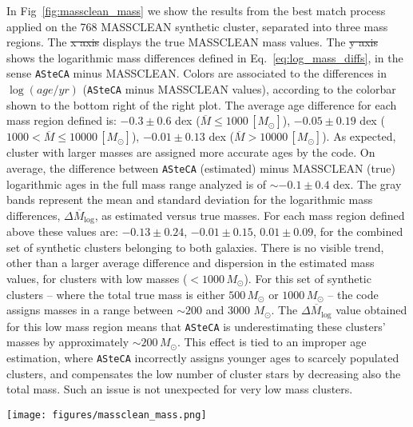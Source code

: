 \documentclass[draft]{aa}
\providecommand{\DIFaddtex}[1]{{\protect\color{blue}\uwave{#1}}} %
\providecommand{\DIFdeltex}[1]{{\protect\color{red}\sout{#1}}}                      %
\providecommand{\DIFaddbegin}{} %
\providecommand{\DIFaddend}{} %
\providecommand{\DIFdelbegin}{} %
\providecommand{\DIFdelend}{} %
\providecommand{\DIFaddFL}[1]{\DIFadd{#1}} %
\providecommand{\DIFdelFL}[1]{\DIFdel{#1}} %
\providecommand{\DIFaddbeginFL}{} %
\providecommand{\DIFaddendFL}{} %
\providecommand{\DIFdelbeginFL}{} %
\providecommand{\DIFdelendFL}{} %
\providecommand{\DIFadd}[1]{\texorpdfstring{\DIFaddtex{#1}}{#1}} %
\providecommand{\DIFdel}[1]{\texorpdfstring{\DIFdeltex{#1}}{}} %
\begin{document}
\begin{appendix}
In Fig~\ref{fig:massclean_mass} we show the results from the best match process
applied on the 768 MASSCLEAN synthetic cluster, separated into three mass
regions. The \DIFdelbegin \DIFdel{x axis }\DIFdelend \DIFaddbegin \DIFadd{x-axis }\DIFaddend displays the true MASSCLEAN mass values. The \DIFdelbegin \DIFdel{y axis }\DIFdelend \DIFaddbegin \DIFadd{y-axis }\DIFaddend shows
the logarithmic mass differences defined in Eq.~\ref{eq:log_mass_diffs}, in the
sense \texttt{ASteCA} minus MASSCLEAN.
%
Colors are associated to the differences in $\log(age/yr)$
(\texttt{ASteCA} minus MASSCLEAN values), according to the colorbar shown to the
bottom right of the right plot. The average age difference for each mass
region defined is: 
$-0.3{\pm}0.6$ dex ($\overline{M}{\le}1000\,[M_{\odot}]$),
$-0.05{\pm}0.19$ dex ($1000{<}\overline{M}{\le}10000\,[M_{\odot}]$),
$-0.01{\pm}0.13$ dex ($\overline{M}{>}10000\,[M_{\odot}]$). As expected, cluster
with larger masses are assigned more accurate ages by the code.
On average, the difference between \texttt{ASteCA} (estimated) minus MASSCLEAN 
(true) logarithmic ages in the full mass range analyzed is of ${\sim}-0.1
{\pm}0.4$ dex.
%
The gray bands represent the mean and standard deviation for the logarithmic
mass differences, $\overline{\Delta M_{\log}}$, as estimated versus true
masses. For each mass region defined above these values are: $-0.13{\pm}0.24$,
$-0.01{\pm}0.15$, $0.01{\pm}0.09$, for the combined set of synthetic clusters
belonging to both galaxies.
%
There is no visible trend, other than a larger average difference and dispersion
in the estimated mass values, for clusters with low masses
(${<}1000\,M_{\odot}$). For this set of synthetic clusters -- where the total
true mass is either $500\,M_{\odot}$ or $1000\,M_{\odot}$ -- the code assigns
masses in a range between ${\sim}200$ and 3000 $M_{\odot}$.
The $\overline{\Delta M_{\log}}$ value obtained for this low mass region means
that \texttt{ASteCA} is underestimating these clusters' masses by approximately
${\sim}200\,M_{\odot}$. This effect is tied to an improper age estimation,
where \texttt{ASteCA} incorrectly assigns younger ages to scarcely populated
clusters, and compensates the low number of cluster stars by decreasing also the
total mass. Such an issue is not unexpected for very low mass clusters.

\begin{figure*}
\texttt{[image: figures/massclean\_mass.png]}
\caption{Recovered masses by \texttt{ASteCA} for the set of 768 MASSCLEAN
synthetic clusters, separated in three mass ranges.
Logarithmic mass differences $\Delta M_{\log}$ are obtained in the sense
\texttt{ASteCA} minus MASSCLEAN (i.e., estimated minus true values), and shown
in the \DIFdelbeginFL \DIFdelFL{y axis}\DIFdelendFL \DIFaddbeginFL \DIFaddFL{y-axis}\DIFaddendFL . MASSCLEAN masses in the \DIFdelbeginFL \DIFdelFL{x axis }\DIFdelendFL \DIFaddbeginFL \DIFaddFL{x-axis }\DIFaddendFL are perturbed with a small
random scatter to improve visibility.}
\label{fig:massclean_mass}
\end{figure*}


\end{appendix}
\end{document}
